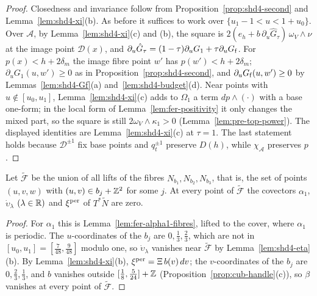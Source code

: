 \begin{proof}
Closedness and invariance follow from Proposition~\ref{prop:shd4-second} and Lemma~\ref{lem:shd4-xi}(b). As before it
suffices to work over $\{u_1-1<u<1+u_0\}$. Over $\mathcal A$, by Lemma~\ref{lem:shd4-xi}(c) and
(b), the square is $2(e_h+b\,\partial_u\hat G_\tau)\,\omega_V\wedge\nu$ at the image point
$\mathcal D(x)$, and $\partial_u\hat G_\tau=(1-\tau)\partial_uG_1+\tau\partial_uG_{\rm f}$. For $p(x)<h+2\delta_m$ the image fibre point $w'$ has
$p(w')<h+2\delta_m$; $\partial_uG_1(u,w')\ge0$ as in Proposition~\ref{prop:shd4-second}, and $\partial_uG_{\rm f}(u,w')\ge0$ by
Lemmas~\ref{lem:shd4-Gf}(a) and~\ref{lem:shd4-budget}(d). Near points with $u\notin[u_0,u_1]$, Lemma~\ref{lem:shd4-xi}(c) adds to
$\Omega_1$ a term $dp\wedge(\cdot)$ with a base one-form; in the local form of Lemma~\ref{lem:fer-positivity} it only changes the
mixed part, so the square is still $2\omega_V\wedge\kappa_1>0$ (Lemma~\ref{lem:pre-top-power}). The displayed identities are
Lemma~\ref{lem:shd4-xi}(c) at $\tau=1$. The last statement holds because $\mathcal D^{\pm1}$ fix base points and $q_t^{\pm1}$ preserve
$D(h)$, while $\chi_{\mathcal A}$ preserves $p$.
\end{proof}

\begin{lemma}\label{lem:shd4-fibres}
Let $\widetilde{\mathcal F}$ be the union of all lifts of the fibres $N_{b_1},N_{b_2},N_{b_3}$, that is, the set of points
$(u,v,w)$ with $(u,v)\in b_j+\mathbb{Z}^2$ for some $j$. At every point of $\widetilde{\mathcal F}$ the covectors $\alpha_1$, $\dot\upsilon_\lambda$ $(\lambda\in\mathbb{R})$ and $\xi^{\rm per}$ of
$T^*\widetilde N$ are zero.
\end{lemma}

\begin{proof}
For $\alpha_1$ this is Lemma~\ref{lem:fer-alpha1-fibres}, lifted to the cover, where $\alpha_1$ is periodic. The
$u$-coordinates of the $b_j$ are $0,\frac13,\frac23$, which are not in $[u_0,u_1]=[\frac7{48},\frac9{48}]$ modulo one, so
$\dot\upsilon_\lambda$ vanishes near $\widetilde{\mathcal F}$ by Lemma~\ref{lem:shd4-eta}(b). By Lemma~\ref{lem:shd4-xi}(b),
$\xi^{\rm per}=\Xi\,b(v)\,dv$; the $v$-coordinates of the $b_j$ are $0,\frac23,\frac13$, and $b$ vanishes outside
$[\frac18,\frac5{24}]+\mathbb{Z}$ (Proposition~\ref{prop:cub-handle}(c)), so $\beta$ vanishes at every point of
$\widetilde{\mathcal F}$.
\end{proof}

